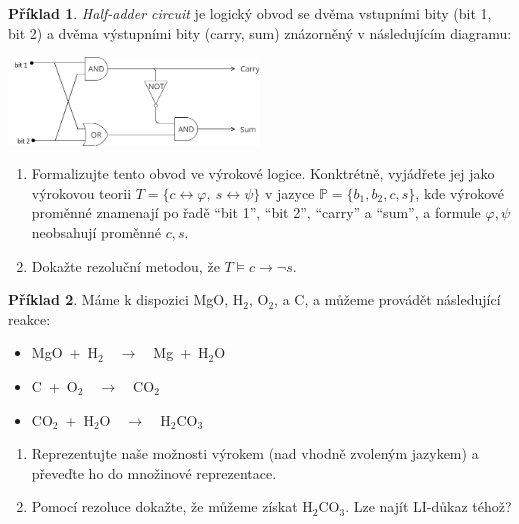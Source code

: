 \documentclass[a4paper]{article}
\theoremstyle{plain}
\theoremstyle{definition}
\newtheorem{problem}{Příklad}
\begin{document}
\medskip\begin{problem}
\emph{Half-adder circuit} je logický obvod se dvěma vstupními bity (bit 1, bit 2) a dvěma výstupními bity (carry, sum) znázorněný v následujícím diagramu:
\begin{center}
    \includegraphics[width=0.5\textwidth]{files/half-adder.png}
\end{center}
\begin{enumerate}
        \item Formalizujte tento obvod ve výrokové logice. Konktrétně, vyjádřete jej jako výrokovou teorii $T=\{c\leftrightarrow \varphi,\ s\leftrightarrow \psi\}$ v jazyce $\mathbb P=\{b_1,b_2,c,s\}$, kde výrokové proměnné znamenají po řadě ``bit 1'', ``bit 2'', ``carry'' a ``sum'', a formule $\varphi,\psi$ neobsahují proměnné $c,s$.
        \item Dokažte rezoluční metodou, že $T\models c\to\neg s$.
\end{enumerate}
\end{problem}


\medskip\begin{problem} Máme k dispozici MgO, H$_2$, O$_2$, a C, a můžeme provádět následující reakce:
    \begin{itemize}
        \item MgO\ +\ H$_2$\ \ $\to$\ \ Mg\ +\ H$_2$O
        \item C\ +\ O$_2$\ \ $\to$\ \ CO$_2$
        \item CO$_2$\ +\ H$_2$O\ \ $\to$\ \ H$_2$CO$_3$
    \end{itemize}
    \begin{enumerate}
        \item Reprezentujte naše možnosti výrokem (nad vhodně zvoleným jazykem) a převeďte ho do množinové reprezentace.
        \item Pomocí rezoluce dokažte, že můžeme získat H$_2$CO$_3$. Lze najít LI-důkaz téhož?
    \end{enumerate}
\end{problem}
\end{document}
